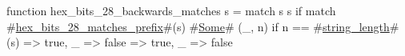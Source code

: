 function hex_bits_28_backwards_matches s = match s {
  s if match #\hyperref[sailRISCVzhexzybitszy28zymatcheszyprefix]{hex\_bits\_28\_matches\_prefix}#(s) {
    #\hyperref[sailRISCVzSome]{Some}# (_, n) if n == #\hyperref[sailRISCVzstringzylength]{string\_length}#(s) => true,
    _ => false
  } => true,
  _ => false
}
